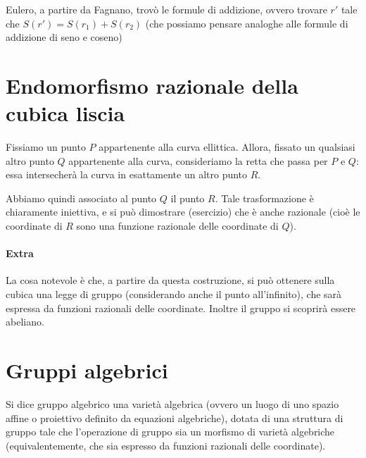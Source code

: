 Eulero, a partire da Fagnano, trovò le formule di addizione, ovvero trovare $r'$ tale che $S(r') = S(r_1) + S(r_2)$ (che possiamo pensare analoghe alle formule di addizione di seno e coseno)

\section{Endomorfismo razionale della cubica liscia}
Fissiamo un punto $P$ appartenente alla curva ellittica. Allora, fissato un qualsiasi altro punto $Q$ appartenente alla curva, consideriamo la retta che passa per $P$ e $Q$: essa intersecherà la curva in esattamente un altro punto $R$.


Abbiamo quindi associato al punto $Q$ il punto $R$. Tale trasformazione è chiaramente iniettiva, e si può dimostrare (esercizio) che è anche razionale (cioè le coordinate di $R$ sono una funzione razionale delle coordinate di $Q$).

\paragraph{Extra}
La cosa notevole è che, a partire da questa costruzione, si può ottenere sulla cubica una legge di gruppo (considerando anche il punto all'infinito), che sarà espressa da funzioni razionali delle coordinate. Inoltre il gruppo si scoprirà essere abeliano.

\section{Gruppi algebrici}
\begin{definizione}
  Si dice gruppo algebrico una varietà algebrica (ovvero un luogo di uno spazio affine o proiettivo definito da equazioni algebriche), dotata di una struttura di gruppo tale che l'operazione di gruppo sia un morfismo di varietà algebriche (equivalentemente, che sia espresso da funzioni razionali delle coordinate).
\end{definizione}

